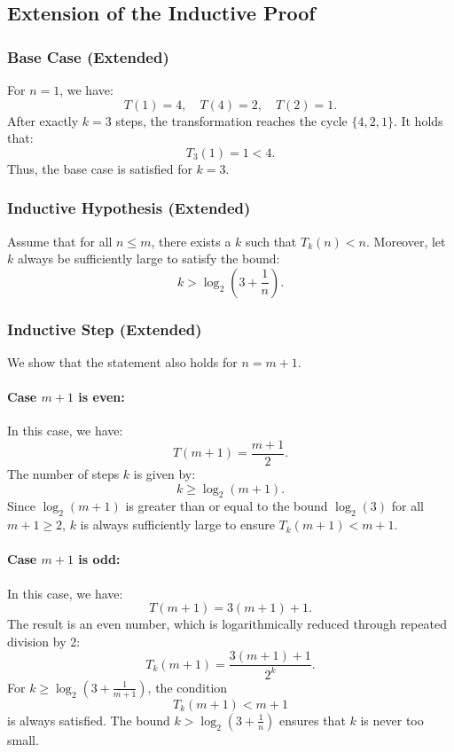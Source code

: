\documentclass[a4paper,12pt]{article}
\begin{document}
\subsection{Extension of the Inductive Proof}
\subsubsection{Base Case (Extended)}
For \( n = 1 \), we have:
\[
T(1) = 4, \quad T(4) = 2, \quad T(2) = 1.
\]
After exactly \( k = 3 \) steps, the transformation reaches the cycle \( \{4, 2, 1\} \). It holds that:
\[
T_3(1) = 1 < 4.
\]
Thus, the base case is satisfied for \( k = 3 \).

\subsubsection{Inductive Hypothesis (Extended)}
Assume that for all \( n \leq m \), there exists a \( k \) such that \( T_k(n) < n \). Moreover, let \( k \) always be sufficiently large to satisfy the bound:
\[
k > \log_2\left(3 + \frac{1}{n}\right).
\]

\subsubsection{Inductive Step (Extended)}
We show that the statement also holds for \( n = m + 1 \).

\paragraph{Case \( m + 1 \) is even:}
In this case, we have:
\[
T(m + 1) = \frac{m + 1}{2}.
\]
The number of steps \( k \) is given by:
\[
k \geq \log_2(m + 1).
\]
Since \( \log_2(m + 1) \) is greater than or equal to the bound \( \log_2(3) \) for all \( m + 1 \geq 2 \), \( k \) is always sufficiently large to ensure \( T_k(m + 1) < m + 1 \).

\paragraph{Case \( m + 1 \) is odd:}
In this case, we have:
\[
T(m + 1) = 3(m + 1) + 1.
\]
The result is an even number, which is logarithmically reduced through repeated division by 2:
\[
T_k(m + 1) = \frac{3(m + 1) + 1}{2^k}.
\]
For \( k \geq \log_2\left(3 + \frac{1}{m + 1}\right) \), the condition
\[
T_k(m + 1) < m + 1
\]
is always satisfied. The bound \( k > \log_2\left(3 + \frac{1}{n}\right) \) ensures that \( k \) is never too small.
\end{document}
